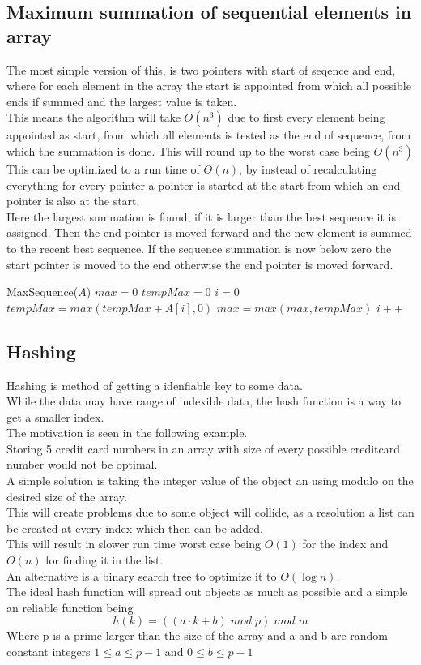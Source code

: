 \documentclass[12pt, a4paper]{article}
\begin{document}
			\subsection{Maximum summation of sequential elements in array}
				The most simple version of this, is two pointers with start of seqence and end, where for each element in the array the start is appointed from which all possible ends if summed and the largest value is taken.\\
				This means the algorithm will take $O(n^3)$ due to first every element being appointed as start, from which all elements is tested as the end of sequence, from which the summation is done. This will round up to the worst case being $O(n^3)$\\
				This can be optimized to a run time of $O(n)$, by instead of recalculating everything for every pointer a pointer is started at the start from which an end pointer is also at the start.\\
				Here the largest summation is found, if it is larger than the best sequence it is assigned. Then the end pointer is moved forward and the new element is summed to the recent best sequence. If the sequence summation is now below zero the start pointer is moved to the end otherwise the end pointer is moved forward.
				\begin{algorithmic}[1]
					\State MaxSequence($A$)
					\State $max = 0$
					\State $tempMax = 0$
					\State $i = 0$
					\While {$i<A.length$}
						\State $tempMax = max(tempMax + A[i], 0)$
						\State $max = max(max, tempMax)$
						\State $i++$
					\EndWhile
				\end{algorithmic}
			\subsection{Hashing}
				Hashing is method of getting a idenfiable key to some data.\\
				While the data may have range of indexible data, the hash function is a way to get a smaller index.\\
				The motivation is seen in the following example.\\
				Storing 5 credit card numbers in an array with size of every possible creditcard number would not be optimal.\\
				A simple solution is taking the integer value of the object an using modulo on the desired size of the array.\\
				This will create problems due to some object will collide, as a resolution a list can be created at every index which then can be added.\\
				This will result in slower run time worst case being $O(1)$ for the index and $O(n)$ for finding it in the list.\\
				An alternative is a binary search tree to optimize it to $O(\log n)$.\\
				The ideal hash function will spread out objects as much as possible and a simple an reliable function being
				$$h(k)=((a\cdot k+b) \;mod\; p)\; mod\; m$$
				Where p is a prime larger than the size of the array and a and b are random constant integers $1\leq a \leq p-1$ and $0\leq b \leq p-1$
\end{document}
